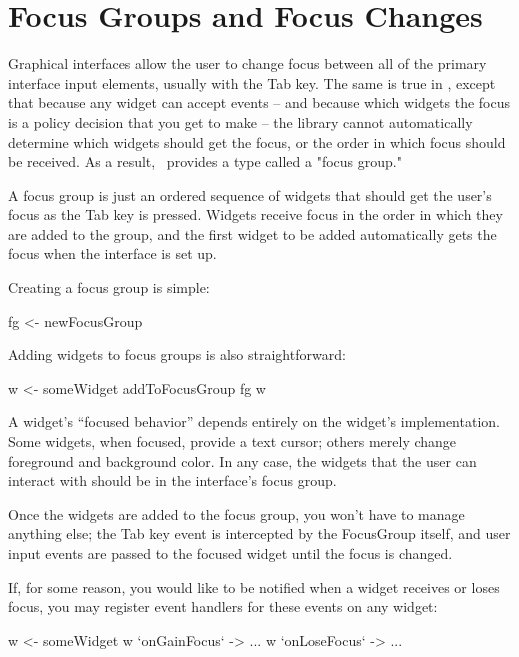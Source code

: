 \section{Focus Groups and Focus Changes}
\label{sec:focus}

Graphical interfaces allow the user to change focus between all of the
primary interface input elements, usually with the Tab key.  The same
is true in \vtyui, except that because any widget can accept events --
and because which widgets the focus is a policy decision that you get
to make -- the library cannot automatically determine which widgets
should get the focus, or the order in which focus should be received.
As a result, \vtyui\ provides a type called a "focus group."

A focus group is just an ordered sequence of widgets that should get the
user's focus as the Tab key is pressed.  Widgets receive focus in the
order in which they are added to the group, and the first widget to be
added automatically gets the focus when the interface is set up.

Creating a focus group is simple:

\begin{haskellcode}
 fg <- newFocusGroup
\end{haskellcode}

Adding widgets to focus groups is also straightforward:

\begin{haskellcode}
 w <- someWidget
 addToFocusGroup fg w
\end{haskellcode}

A widget's ``focused behavior'' depends entirely on the widget's
implementation.  Some widgets, when focused, provide a text cursor;
others merely change foreground and background color.  In any case,
the widgets that the user can interact with should be in the
interface's focus group.

Once the widgets are added to the focus group, you won't have to manage
anything else; the Tab key event is intercepted by the FocusGroup
itself, and user input events are passed to the focused widget until the
focus is changed.

If, for some reason, you would like to be notified when a widget
receives or loses focus, you may register event handlers for these
events on any widget:

\begin{haskellcode}
 w <- someWidget
 w `onGainFocus` \this -> ...
 w `onLoseFocus` \this -> ...
\end{haskellcode}

